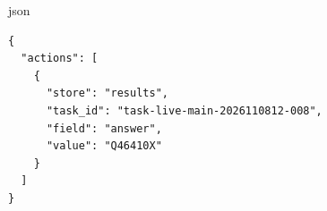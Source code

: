 {\ttfamily{} json}\par
\begin{verbatim}
{
  "actions": [
    {
      "store": "results",
      "task_id": "task-live-main-2026110812-008",
      "field": "answer",
      "value": "Q46410X"
    }
  ]
}
\end{verbatim}
{\ttfamily{}}\par
